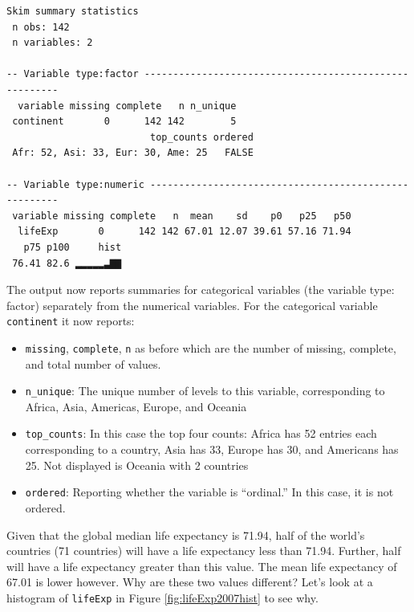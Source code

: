 \documentclass[12pt, krantz2,]{krantz}
\makeatletter
\newenvironment{Shaded}{\begin{snugshade}}{\end{snugshade}}
\newcommand{\KeywordTok}[1]{\textcolor[rgb]{0.27,0.27,0.27}{\textbf{#1}}}
\newcommand{\NormalTok}[1]{#1}
\newcommand{\OperatorTok}[1]{\textcolor[rgb]{0.43,0.43,0.43}{\textbf{#1}}}
\newcommand{\StringTok}[1]{\textcolor[rgb]{0.5,0.5,0.5}{#1}}
\providecommand{\tightlist}{%
  \setlength{\itemsep}{0pt}\setlength{\parskip}{0pt}}
\newenvironment{kframe}{%
\medskip{}
\setlength{\fboxsep}{.8em}
 \def\at@end@of@kframe{}%
 \ifinner\ifhmode%
  \def\at@end@of@kframe{\end{minipage}}%
  \begin{minipage}{\columnwidth}%
 \fi\fi%
 \def\FrameCommand##1{\hskip\@totalleftmargin \hskip-\fboxsep
 \colorbox{shadecolor}{##1}\hskip-\fboxsep
     \hskip-\linewidth \hskip-\@totalleftmargin \hskip\columnwidth}%
 \MakeFramed {\advance\hsize-\width
   \@totalleftmargin\z@ \linewidth\hsize
   \@setminipage}}%
 {\par\unskip\endMakeFramed%
 \at@end@of@kframe}
\renewenvironment{Shaded}{\begin{kframe}}{\end{kframe}}
\makeatother
\begin{document}
\begin{Shaded}
\end{Shaded}

\begin{verbatim}
Skim summary statistics
 n obs: 142 
 n variables: 2 

-- Variable type:factor -------------------------------------------------------
  variable missing complete   n n_unique
 continent       0      142 142        5
                         top_counts ordered
 Afr: 52, Asi: 33, Eur: 30, Ame: 25   FALSE

-- Variable type:numeric ------------------------------------------------------
 variable missing complete   n  mean    sd    p0   p25   p50
  lifeExp       0      142 142 67.01 12.07 39.61 57.16 71.94
   p75 p100     hist
 76.41 82.6 ▂▂▂▂▂▃▇▇
\end{verbatim}

The output now reports summaries for categorical variables (the variable type: factor) separately from the numerical variables. For the categorical variable \texttt{continent} it now reports:

\begin{itemize}
\tightlist
\item
  \texttt{missing}, \texttt{complete}, \texttt{n} as before which are the number of missing, complete, and total number of values.
\item
  \texttt{n\_unique}: The unique number of levels to this variable, corresponding to Africa, Asia, Americas, Europe, and Oceania
\item
  \texttt{top\_counts}: In this case the top four counts: Africa has 52 entries each corresponding to a country, Asia has 33, Europe has 30, and Americans has 25. Not displayed is Oceania with 2 countries
\item
  \texttt{ordered}: Reporting whether the variable is ``ordinal.'' In this case, it is not ordered.
\end{itemize}

Given that the global median life expectancy is 71.94, half of the world's countries (71 countries) will have a life expectancy less than 71.94. Further, half will have a life expectancy greater than this value. The mean life expectancy of 67.01 is lower however. Why are these two values different? Let's look at a histogram of \texttt{lifeExp} in Figure \ref{fig:lifeExp2007hist} to see why.
\end{document}
